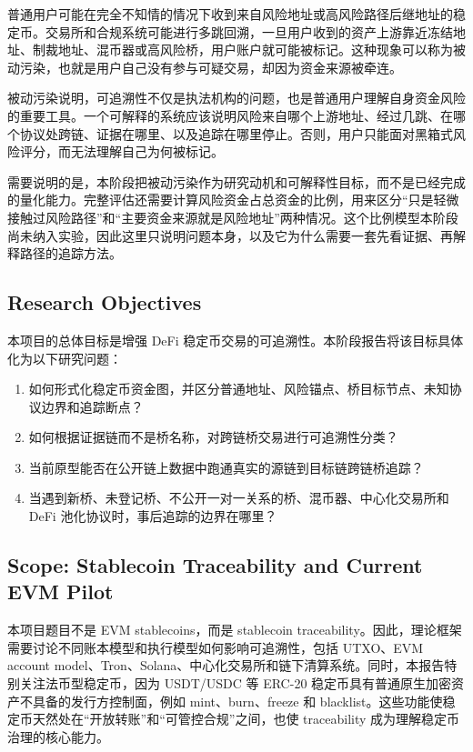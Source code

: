 \documentclass[12pt,a4paper]{ctexart}
\providecommand{\tightlist}{\setlength{\itemsep}{0pt}\setlength{\parskip}{0pt}}
\begin{document}
普通用户可能在完全不知情的情况下收到来自风险地址或高风险路径后继地址的稳定币。交易所和合规系统可能进行多跳回溯，一旦用户收到的资产上游靠近冻结地址、制裁地址、混币器或高风险桥，用户账户就可能被标记。这种现象可以称为被动污染，也就是用户自己没有参与可疑交易，却因为资金来源被牵连。

被动污染说明，可追溯性不仅是执法机构的问题，也是普通用户理解自身资金风险的重要工具。一个可解释的系统应该说明风险来自哪个上游地址、经过几跳、在哪个协议处跨链、证据在哪里、以及追踪在哪里停止。否则，用户只能面对黑箱式风险评分，而无法理解自己为何被标记。

需要说明的是，本阶段把被动污染作为研究动机和可解释性目标，而不是已经完成的量化能力。完整评估还需要计算风险资金占总资金的比例，用来区分``只是轻微接触过风险路径''和``主要资金来源就是风险地址''两种情况。这个比例模型本阶段尚未纳入实验，因此这里只说明问题本身，以及它为什么需要一套先看证据、再解释路径的追踪方法。

\hypertarget{research-objectives}{%
\subsection{Research Objectives}\label{research-objectives}}

本项目的总体目标是增强 DeFi
稳定币交易的可追溯性。本阶段报告将该目标具体化为以下研究问题：

\begin{enumerate}
\def\labelenumi{\arabic{enumi}.}
\tightlist
\item
  如何形式化稳定币资金图，并区分普通地址、风险锚点、桥目标节点、未知协议边界和追踪断点？
\item
  如何根据证据链而不是桥名称，对跨链桥交易进行可追溯性分类？
\item
  当前原型能否在公开链上数据中跑通真实的源链到目标链跨链桥追踪？
\item
  当遇到新桥、未登记桥、不公开一对一关系的桥、混币器、中心化交易所和 DeFi
  池化协议时，事后追踪的边界在哪里？
\end{enumerate}

\hypertarget{scope-stablecoin-traceability-and-current-evm-pilot}{%
\subsection{Scope: Stablecoin Traceability and Current EVM
Pilot}\label{scope-stablecoin-traceability-and-current-evm-pilot}}

本项目题目不是 EVM stablecoins，而是 stablecoin
traceability。因此，理论框架需要讨论不同账本模型和执行模型如何影响可追溯性，包括
UTXO、EVM account
model、Tron、Solana、中心化交易所和链下清算系统。同时，本报告特别关注法币型稳定币，因为
USDT/USDC 等 ERC-20 稳定币具有普通原生加密资产不具备的发行方控制面，例如
mint、burn、freeze 和
blacklist。这些功能使稳定币天然处在``开放转账''和``可管控合规''之间，也使
traceability 成为理解稳定币治理的核心能力。
\end{document}
